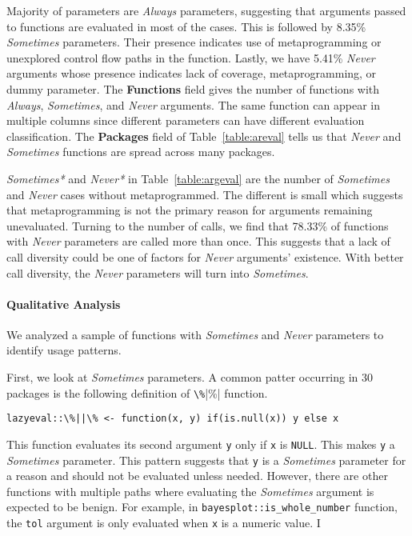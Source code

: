 \documentclass[review,nonacm,screen,acmsmall,anonymous=true]{acmart}
\newcommand{\always}{\emph{Always}\xspace}
\newcommand{\sometimes}{\emph{Sometimes}\xspace}
\newcommand{\sometimesStar}{\emph{Sometimes*}\xspace}
\newcommand{\never}{\emph{Never}\xspace}
\newcommand{\neverStar}{\emph{Never*}\xspace}
\newcommand{\code}[1]{\lstinline |#1|\xspace}
\begin{document}
Majority of parameters are \always parameters, suggesting that arguments passed
to functions are evaluated in most of the cases. This is followed by 8.35\%
\sometimes parameters. Their presence indicates use of metaprogramming or
unexplored control flow paths in the function. Lastly, we have 5.41\% \never
arguments whose presence indicates lack of coverage, metaprogramming, or dummy
parameter. The \textbf{Functions} field gives the number of functions with
\always, \sometimes, and \never arguments. The same function can appear in
multiple columns since different parameters can have different evaluation
classification. The \textbf{Packages} field of Table~\ref{table:areval} tells us
that \never and \sometimes functions are spread across many packages.


\sometimesStar and \neverStar in Table~\ref{table:argeval} are the number of
\sometimes and \never cases without metaprogrammed. The different is small which
suggests that metaprogramming is not the primary reason for arguments remaining
unevaluated. Turning to the number of calls, we find that 78.33\% of functions
with \never parameters are called more than once. This suggests that a lack of
call diversity could be one of factors for \never arguments' existence. With
better call diversity, the \never parameters will turn into \sometimes.

\paragraph{Qualitative Analysis}

We analyzed a sample of functions with \sometimes and \never parameters to
identify usage patterns.

First, we look at \sometimes parameters. A common patter occurring in 30
packages is the following definition of \code{\%||\%} function.

\begin{lstlisting}
lazyeval::\%||\% <- function(x, y) if(is.null(x)) y else x
\end{lstlisting}

This function evaluates its second argument \code{y} only if \code{x} is
\code{NULL}. This makes \code{y} a \sometimes parameter. This pattern suggests
that \code{y} is a \sometimes parameter for a reason and should not be evaluated
unless needed. However, there are other functions with multiple paths where
evaluating the \sometimes argument is expected to be benign. For example, in
\code{bayesplot::is_whole_number} function, the \code{tol} argument is only
evaluated when \code{x} is a numeric value. I
\end{document}
